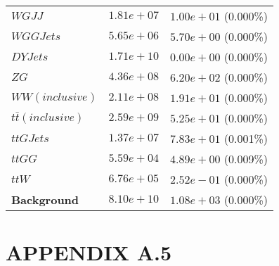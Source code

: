 \begin{table}[h!]
\begin{tabular}{ |l|c|c| }
                                    $WGJJ$ &  $1.81e+07$  &  $1.00e+01$ (0.000\%) \\
                                 $WGGJets$ &  $5.65e+06$  &  $5.70e+00$ (0.000\%) \\
                                  $DYJets$ &  $1.71e+10$  &  $0.00e+00$ (0.000\%) \\
                                      $ZG$ &  $4.36e+08$  &  $6.20e+02$ (0.000\%) \\
                           $WW(inclusive)$ &  $2.11e+08$  &  $1.91e+01$ (0.000\%) \\
                    $t\bar{t} (inclusive)$ &  $2.59e+09$  &  $5.25e+01$ (0.000\%) \\
                                 $ttGJets$ &  $1.37e+07$  &  $7.83e+01$ (0.001\%) \\
                                    $ttGG$ &  $5.59e+04$  &  $4.89e+00$ (0.009\%) \\
                                     $ttW$ &  $6.76e+05$  &  $2.52e-01$ (0.000\%) \\
                       \textbf{Background} &  $8.10e+10$  &  $1.08e+03$ (0.000\%) \\
    \hline
\end{tabular}
\label{fullyleptonic-cutflow}
\end{table}
\newpage


\section*{APPENDIX A.5}\label{App5}

